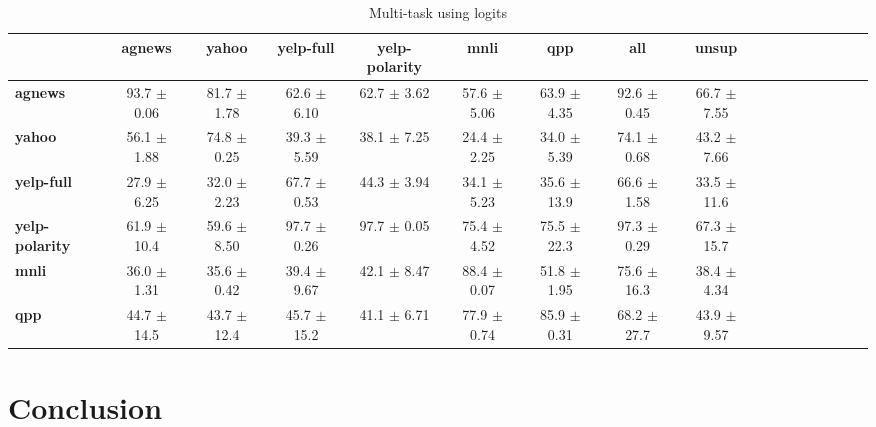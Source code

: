 \documentclass[11pt,a4paper]{article}
\begin{document}
\begin{table}[]
	\centering
	\fontsize{9}{13}
	\selectfont
	\begin{tabular}{lcccccccccccccccc}
		\toprule
		& \textbf{agnews}    & \textbf{yahoo}    & \textbf{yelp-full}    & \textbf{yelp-polarity}    & \textbf{mnli}    & \textbf{qpp}    & \textbf{all}    & \textbf{unsup}    \\ \hline
		\textbf{agnews}        & 93.7   \tiny$\pm$ 0.06      & 81.7   \tiny$\pm$ 1.78      & 62.6      \tiny$\pm$ 6.10      & 62.7          \tiny$\pm$ 3.62      & 57.6 \tiny$\pm$ 5.06      & 63.9 \tiny$\pm$ 4.35      & 92.6 \tiny$\pm$ 0.45      & 66.7   \tiny$\pm$ 7.55      \\
		\textbf{yahoo}         & 56.1    \tiny$\pm$ 1.88      & 74.8   \tiny$\pm$ 0.25      & 39.3       \tiny$\pm$ 5.59      & 38.1           \tiny$\pm$ 7.25      & 24.4  \tiny$\pm$ 2.25      & 34.0 \tiny$\pm$ 5.39      & 74.1 \tiny$\pm$ 0.68      & 43.2   \tiny$\pm$ 7.66      \\
		\textbf{yelp-full}     & 27.9    \tiny$\pm$ 6.25      & 32.0   \tiny$\pm$ 2.23      & 67.7       \tiny$\pm$ 0.53      & 44.3           \tiny$\pm$ 3.94      & 34.1  \tiny$\pm$ 5.23      & 35.6 \tiny$\pm$ 13.9      & 66.6 \tiny$\pm$ 1.58      & 33.5   \tiny$\pm$ 11.6      \\
		\textbf{yelp-polarity} & 61.9    \tiny$\pm$ 10.4      & 59.6   \tiny$\pm$ 8.50      & 97.7       \tiny$\pm$ 0.26      & 97.7           \tiny$\pm$ 0.05      & 75.4  \tiny$\pm$ 4.52      & 75.5 \tiny$\pm$ 22.3      & 97.3 \tiny$\pm$ 0.29      & 67.3   \tiny$\pm$ 15.7      \\
		\textbf{mnli}          & 36.0    \tiny$\pm$ 1.31      & 35.6   \tiny$\pm$ 0.42      & 39.4       \tiny$\pm$ 9.67      & 42.1           \tiny$\pm$ 8.47      & 88.4  \tiny$\pm$ 0.07      & 51.8 \tiny$\pm$ 1.95      & 75.6 \tiny$\pm$ 16.3      & 38.4   \tiny$\pm$ 4.34      \\
		\textbf{qpp}           & 44.7    \tiny$\pm$ 14.5      & 43.7   \tiny$\pm$ 12.4      & 45.7       \tiny$\pm$ 15.2      & 41.1           \tiny$\pm$ 6.71      & 77.9  \tiny$\pm$ 0.74      & 85.9 \tiny$\pm$ 0.31      & 68.2 \tiny$\pm$ 27.7      & 43.9   \tiny$\pm$ 9.57      \\ \bottomrule
	\end{tabular}
\caption{Multi-task using logits}\label{tab:single-on-train-set-summary}
\end{table}

\section{Conclusion}
\end{document}
